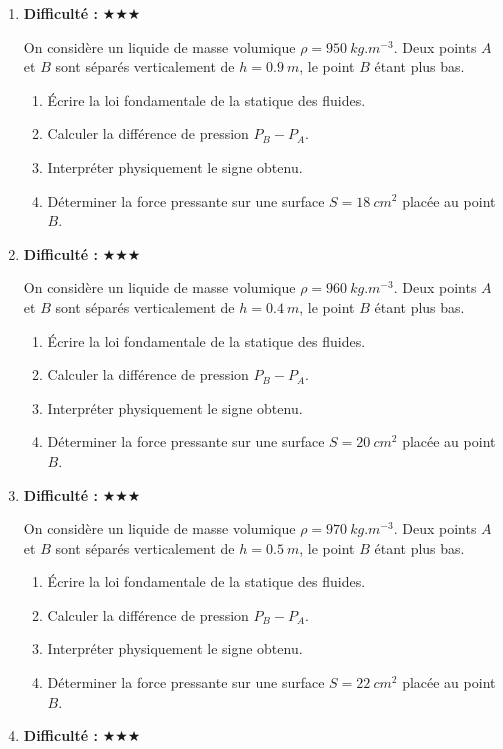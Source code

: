 \documentclass[11pt,a4paper]{article}
\newcommand{\etoiles}[1]{\textbf{Difficulté : }#1}
\begin{document}
\begin{enumerate}[label=\textbf{Exercice \arabic*.},leftmargin=*]
On considère un liquide de masse volumique $\rho=940\ \si{kg.m^{-3}}$.
Deux points $A$ et $B$ sont séparés verticalement de $h=0.8\ \si{m}$, le point $B$ étant plus bas.
\begin{enumerate}[label=\alph*)]
\item Écrire la loi fondamentale de la statique des fluides.
\item Calculer la différence de pression $P_B-P_A$.
\item Interpréter physiquement le signe obtenu.
\item Déterminer la force pressante sur une surface $S=26\ \si{cm^2}$ placée au point $B$.
\end{enumerate}
\item \etoiles{★★★}

On considère un liquide de masse volumique $\rho=950\ \si{kg.m^{-3}}$.
Deux points $A$ et $B$ sont séparés verticalement de $h=0.9\ \si{m}$, le point $B$ étant plus bas.
\begin{enumerate}[label=\alph*)]
\item Écrire la loi fondamentale de la statique des fluides.
\item Calculer la différence de pression $P_B-P_A$.
\item Interpréter physiquement le signe obtenu.
\item Déterminer la force pressante sur une surface $S=18\ \si{cm^2}$ placée au point $B$.
\end{enumerate}
\item \etoiles{★★★}

On considère un liquide de masse volumique $\rho=960\ \si{kg.m^{-3}}$.
Deux points $A$ et $B$ sont séparés verticalement de $h=0.4\ \si{m}$, le point $B$ étant plus bas.
\begin{enumerate}[label=\alph*)]
\item Écrire la loi fondamentale de la statique des fluides.
\item Calculer la différence de pression $P_B-P_A$.
\item Interpréter physiquement le signe obtenu.
\item Déterminer la force pressante sur une surface $S=20\ \si{cm^2}$ placée au point $B$.
\end{enumerate}
\item \etoiles{★★★}

On considère un liquide de masse volumique $\rho=970\ \si{kg.m^{-3}}$.
Deux points $A$ et $B$ sont séparés verticalement de $h=0.5\ \si{m}$, le point $B$ étant plus bas.
\begin{enumerate}[label=\alph*)]
\item Écrire la loi fondamentale de la statique des fluides.
\item Calculer la différence de pression $P_B-P_A$.
\item Interpréter physiquement le signe obtenu.
\item Déterminer la force pressante sur une surface $S=22\ \si{cm^2}$ placée au point $B$.
\end{enumerate}
\item \etoiles{★★★}


\end{enumerate}
\end{document}
